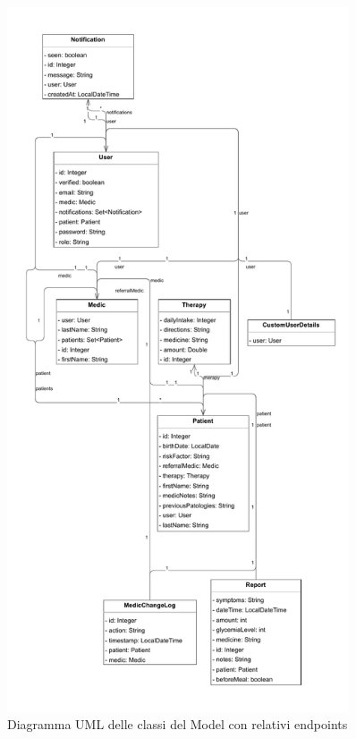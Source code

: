 \documentclass[a4paper]{article}
\begin{document}
\begin{figure}[H]
  \begin{center}
    \includegraphics[width=0.9\textwidth]{umlModel.pdf}
  \end{center}
  \caption{Diagramma UML delle classi del Model con relativi endpoints} 
\end{figure}
\noindent
\end{document}
